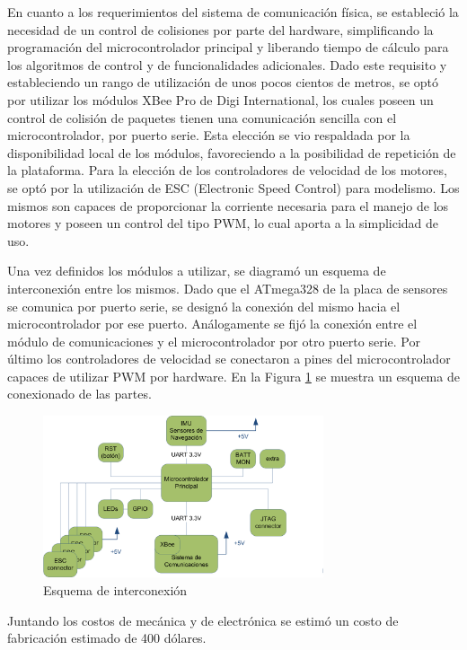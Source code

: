 \documentclass[a4paper, conference]{IEEEtran}
\begin{document}
En cuanto a los requerimientos del sistema de comunicación física, se estableció la necesidad de un control de colisiones por parte del hardware, simplificando la programación del microcontrolador principal y liberando tiempo de cálculo para los algoritmos de control y de funcionalidades adicionales. Dado este requisito y estableciendo un rango de utilización de unos pocos cientos de metros, se optó por utilizar los módulos XBee Pro de Digi International, los cuales poseen un control de colisión de paquetes tienen una comunicación sencilla con el microcontrolador, por puerto serie. Esta elección se vio respaldada por la disponibilidad local de los módulos, favoreciendo a la posibilidad de repetición de la plataforma.
Para la elección de los controladores de velocidad de los motores, se optó por la utilización de ESC (Electronic Speed Control) para modelismo. Los mismos son capaces de proporcionar la corriente necesaria para el manejo de los motores y poseen un control del tipo PWM, lo cual aporta a la simplicidad de uso.

Una vez definidos los módulos a utilizar, se diagramó un esquema de interconexión entre los mismos. Dado que el ATmega328 de la placa de sensores se comunica por puerto serie, se designó la conexión del mismo hacia el microcontrolador por ese puerto. Análogamente se fijó la conexión entre el módulo de comunicaciones y el microcontrolador por otro puerto serie. Por último los controladores de velocidad se conectaron a pines del microcontrolador capaces de utilizar PWM por hardware. En la Figura \ref{ref:conexiones} se muestra un esquema de conexionado de las partes.
	
\begin{figure}[btp]
\centering
\includegraphics[width=3.25in]{interconexion.png}
\caption{Esquema de interconexión}
\label{ref:conexiones}
\end{figure}

Juntando los costos de mecánica y de electrónica se estimó un costo de fabricación estimado de 400 dólares.
\end{document}
